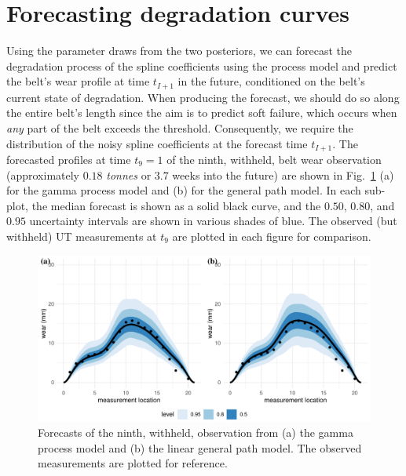 \section{Forecasting degradation curves} \label{sec:belt-wear-forecast}

Using the parameter draws from the two posteriors, we can forecast the degradation process of the spline coefficients using the process model and predict the belt's wear profile at time $t_{I+1}$ in the future, conditioned on the belt's current state of degradation. When producing the forecast, we should do so along the entire belt's length since the aim is to predict soft failure, which occurs when \emph{any} part of the belt exceeds the threshold. Consequently, we require the distribution of the noisy spline coefficients at the forecast time $t_{I + 1}$. The forecasted profiles at time $t_9 = 1$ of the ninth, withheld, belt wear observation (approximately $0.18$ \textit{tonnes} or $3.7$ weeks into the future) are shown in Fig.~\ref{fig:beltwear-forecasts} (a) for the gamma process model and (b) for the general path model. In each sub-plot, the median forecast is shown as a solid black curve, and the $0.50$, $0.80$, and $0.95$ uncertainty intervals are shown in various shades of blue. The observed (but withheld) UT measurements at $t_9$ are plotted in each figure for comparison.

\begin{figure}
  \centering
  \includegraphics[width=\textwidth]{figures/ch-6/belt_wear_forecasts.pdf}
  \caption{Forecasts of the ninth, withheld, observation from (a) the gamma process model and (b) the linear general path model. The observed measurements are plotted for reference.}
  \label{fig:beltwear-forecasts}
\end{figure}

